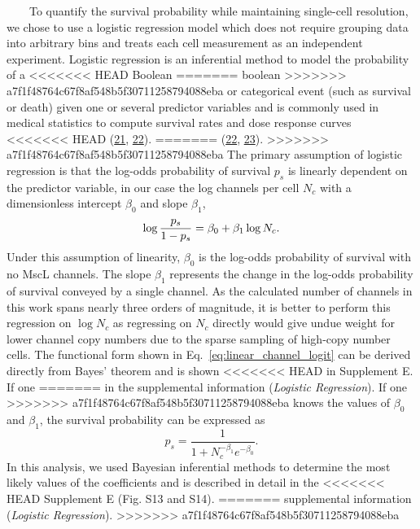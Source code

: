 ~~~~To
quantify
the
survival
probability
while
maintaining
single-cell
resolution,
we
chose
to use
a
logistic
regression
model
which
does
not
require
grouping
data
into
arbitrary
bins
and
treats
each
cell
measurement
as an
independent
experiment.
Logistic
regression
is an
inferential
method
to
model
the
probability
of a
<<<<<<< HEAD
Boolean
=======
boolean
>>>>>>> a7f1f48764c67f8af548b5f30711258794088eba
or
categorical
event
(such
as
survival
or
death)
given
one or
several
predictor
variables
and is
commonly
used
in
medical
statistics
to
compute
survival
rates
and
dose
response
curves
<<<<<<< HEAD
(\protect\hyperlink{ref-anderson2003}{21},
\protect\hyperlink{ref-mishra2016}{22}).
=======
(\protect\hyperlink{ref-anderson2003}{22},
\protect\hyperlink{ref-mishra2016}{23}).
>>>>>>> a7f1f48764c67f8af548b5f30711258794088eba
The
primary
assumption
of
logistic
regression
is
that
the
log-odds
probability
of
survival
\(p_{s}\)
is
linearly
dependent
on the
predictor
variable,
in our
case
the
log
channels
per
cell
\(N_{c}\)
with a
dimensionless
intercept
\(\beta_0\)
and
slope
\(\beta_1\),
\begin{equation}
\log{p_s \over 1 - p_s} = \beta_0 + \beta_1 \log N_c.
\label{eq:linear_channel_logit}\end{equation}
Under
this
assumption
of
linearity,
\(\beta_0\)
is the
log-odds
probability
of
survival
with
no
MscL
channels.
The
slope
\(\beta_1\)
represents
the
change
in the
log-odds
probability
of
survival
conveyed
by a
single
channel.
As the
calculated
number
of
channels
in
this
work
spans
nearly
three
orders
of
magnitude,
it is
better
to
perform
this
regression
on
\(\log N_c\)
as
regressing
on
\(N_c\)
directly
would
give
undue
weight
for
lower
channel
copy
numbers
due to
the
sparse
sampling
of
high-copy
number
cells.
The
functional
form
shown
in
Eq.~\ref{eq:linear_channel_logit}
can be
derived
directly
from
Bayes'
theorem
and is
shown
<<<<<<< HEAD
in
Supplement
E. If
one
=======
in the
supplemental
information
(\emph{Logistic
Regression}).
If one
>>>>>>> a7f1f48764c67f8af548b5f30711258794088eba
knows
the
values
of
\(\beta_0\)
and
\(\beta_1\),
the
survival
probability
can be
expressed
as
\begin{equation}
p_s = \frac{1}{1 + N_c^{-\beta_1}e^{-\beta_0}}.
\label{eq:prob}\end{equation}
In
this
analysis,
we
used
Bayesian
inferential
methods
to
determine
the
most
likely
values
of the
coefficients
and is
described
in
detail
in the
<<<<<<< HEAD
Supplement
E
(Fig.
S13
and
S14).
=======
supplemental
information
(\emph{Logistic
Regression}).
>>>>>>> a7f1f48764c67f8af548b5f30711258794088eba

